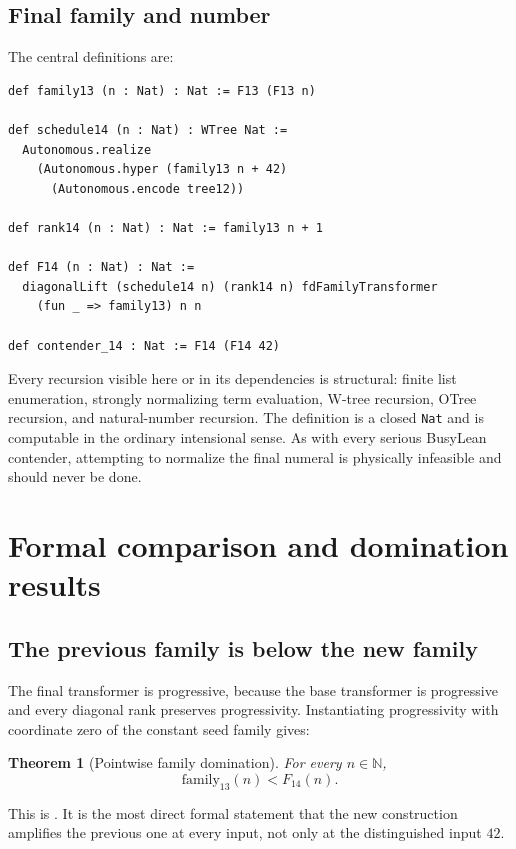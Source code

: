 \documentclass[11pt]{article}
\newtheorem{theorem}{Theorem}[section]
\theoremstyle{definition}
\newcommand{\Nat}{\mathbb{N}}
\newcommand{\code}[1]{\texttt{#1}}
\begin{document}
\subsection{Final family and number}

The central definitions are:

\begin{lstlisting}[caption={Contender 14, schematic ASCII rendering.}]
def family13 (n : Nat) : Nat := F13 (F13 n)

def schedule14 (n : Nat) : WTree Nat :=
  Autonomous.realize
    (Autonomous.hyper (family13 n + 42)
      (Autonomous.encode tree12))

def rank14 (n : Nat) : Nat := family13 n + 1

def F14 (n : Nat) : Nat :=
  diagonalLift (schedule14 n) (rank14 n) fdFamilyTransformer
    (fun _ => family13) n n

def contender_14 : Nat := F14 (F14 42)
\end{lstlisting}

Every recursion visible here or in its dependencies is structural: finite list enumeration, strongly normalizing term evaluation, W-tree recursion, OTree recursion, and natural-number recursion.  The definition is a closed \code{Nat} and is computable in the ordinary intensional sense.  As with every serious BusyLean contender, attempting to normalize the final numeral is physically infeasible and should never be done.

\section{Formal comparison and domination results}

\subsection{The previous family is below the new family}

The final transformer is progressive, because the base transformer is progressive and every diagonal rank preserves progressivity.  Instantiating progressivity with coordinate zero of the constant seed family gives:

\begin{theorem}[Pointwise family domination]
For every $n\in\Nat$,
\[
  \mathrm{family}_{13}(n)<F_{14}(n).
\]
\end{theorem}

This is .  It is the most direct formal statement that the new construction amplifies the previous one at every input, not only at the distinguished input $42$.
\end{document}
